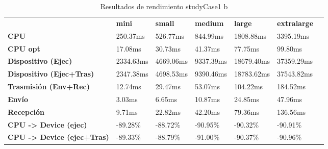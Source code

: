 \begin{table}[H]
    \centering
    \begin{tabular}{lllllll}
    \rowcolor[HTML]{DAE8FC} \ &  \textbf{mini} &  \textbf{small} &  \textbf{medium} &  \textbf{	large} &  \textbf{	extralarge} \\
    \cellcolor[HTML]{DAE8FC} \textbf{CPU} & 250.37ms & 526.77ms & 844.99ms & 	1808.88ms & 	3395.19ms \\
    \rowcolor[HTML]{EFEFEF} \cellcolor[HTML]{DAE8FC} \textbf{CPU opt} & 17.08ms & 30.73ms & 41.37ms & 	77.75ms & 	99.80ms \\
    \cellcolor[HTML]{DAE8FC} \textbf{Dispositivo (Ejec)} & 2334.63ms & 4669.06ms & 9337.39ms & 	18679.40ms & 	37359.29ms \\
    \rowcolor[HTML]{EFEFEF} \cellcolor[HTML]{DAE8FC} \textbf{Dispositivo (Ejec+Tras)} & 2347.38ms & 4698.53ms & 9390.46ms & 	18783.62ms & 	37543.82ms \\
    \cellcolor[HTML]{DAE8FC} \textbf{Trasmisión (Env+Rec)} & 12.74ms & 29.47ms & 53.07ms & 	104.22ms & 	184.52ms \\
    \rowcolor[HTML]{EFEFEF} \cellcolor[HTML]{DAE8FC} \textbf{Envío} & 3.03ms & 6.65ms & 10.87ms & 	24.85ms & 	47.96ms \\
    \cellcolor[HTML]{DAE8FC} \textbf{Recepción} & 9.71ms & 22.82ms & 42.20ms & 	79.36ms & 	136.56ms \\
    \rowcolor[HTML]{EFEFEF} \cellcolor[HTML]{DAE8FC} \textbf{CPU -> Device (ejec)} & -89.28\% & -88.72\% & -90.95\% & 	-90.32\% & 	-90.91\% \\
    \cellcolor[HTML]{DAE8FC} \textbf{CPU -> Device (ejec+Tras)} & -89.33\% & -88.79\% & -91.00\% & 	-90.37\% & 	-90.96\% \\
    \end{tabular}
    \caption[Resultados de rendimiento studyCase1 b]{{Resultados de rendimiento studyCase1 b}}
    \label{table_test_studyCase1_b_hw_performanceResults}
\end{table}